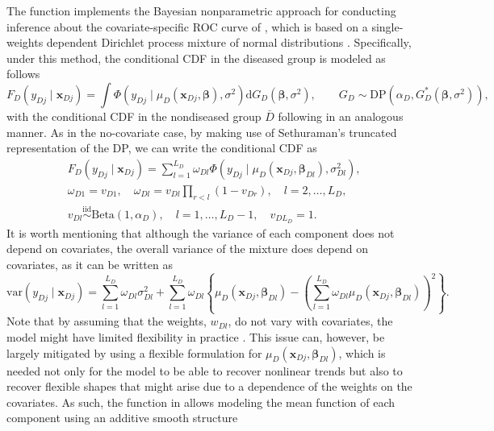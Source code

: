 The function  implements the Bayesian nonparametric approach for conducting inference about the covariate-specific ROC curve of \cite{Inacio13}, which is based on a single-weights dependent Dirichlet process mixture of normal distributions \citep{Iorio2009}. Specifically, under this method, the conditional CDF in the diseased group is modeled as follows
\begin{equation*}
F_{D}(y_{Dj}\mid \mathbf{x}_{Dj})=\int \Phi(y_{Dj}\mid \mu_{D}(\mathbf{x}_{Dj},\boldsymbol{\beta}),\sigma^2)
\text{d}G_D(\boldsymbol{\beta},\sigma^2),\qquad G_D\sim\text{DP}(\alpha_D,G_{D}^{*}(\boldsymbol{\beta},\sigma^2)),
\end{equation*}
with the conditional CDF in the nondiseased group $\bar{D}$ following in an analogous manner. As in the no-covariate case, by making use of Sethuraman's truncated representation of the DP, we can write the conditional CDF as
\begin{align*}
&F_{D}(y_{Dj}\mid\mathbf{x}_{Dj}) = \sum_{l=1}^{L_D}\omega_{Dl}\Phi(y_{Dj}\mid \mu_{D}(\mathbf{x}_{Dj},\boldsymbol{\beta}_{Dl}),\sigma_{Dl}^2),\\
&\omega_{D1}=v_{D1},\quad \omega_{Dl}=v_{Dl}\prod_{r<l}(1-v_{Dr}),\quad l=2,\ldots, L_{D},\\
&v_{Dl}\overset{\text{iid}}\sim\text{Beta}(1,\alpha_D),\quad l = 1,\ldots,L_{D}-1,\quad v_{DL_{D}}=1.
\end{align*}
It is worth mentioning that although the variance of each component does not depend on covariates, the overall variance of the mixture does depend on covariates, as it can be written as
\begin{equation*}
\text{var}(y_{Dj}\mid\mathbf{x}_{Dj})=\sum_{l=1}^{L_D}\omega_{Dl}\sigma_{Dl}^{2}+\sum_{l=1}^{L_D}\omega_{Dl}\left\{\mu_{D}(\mathbf{x}_{Dj},\boldsymbol{\beta}_{Dl})-\left(\sum_{l=1}^{L_D}\omega_{Dl}\mu_{D}(\mathbf{x}_{Dj},\boldsymbol{\beta}_{Dl})\right)^2\right\}.
\end{equation*}
Note that by assuming that the weights, $w_{Dl}$, do not vary with covariates, the model might have limited flexibility in practice \citep{Maceachern2000}. This issue can, however, be largely mitigated by using a flexible formulation for $\mu_{D}(\mathbf{x}_{Dj},\boldsymbol{\beta}_{Dl})$, which is needed not only for the model to be able to recover nonlinear trends but also to recover flexible shapes that might arise due to a dependence of the weights on the covariates. As such, the function  in  allows modeling the mean function of each component using an additive smooth structure 
